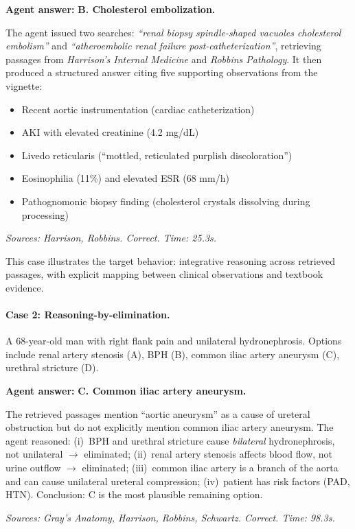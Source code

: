 \documentclass[10pt,twocolumn,letterpaper]{article}
\begin{document}
\begin{casebox}
\textbf{Agent answer:} \textbf{B. Cholesterol embolization.}

The agent issued two searches: \textit{``renal biopsy spindle-shaped vacuoles cholesterol embolism''} and \textit{``atheroembolic renal failure post-catheterization''}, retrieving passages from \textit{Harrison's Internal Medicine} and \textit{Robbins Pathology}. It then produced a structured answer citing five supporting observations from the vignette:
\begin{itemize}[nosep,leftmargin=*]
\item Recent aortic instrumentation (cardiac catheterization)
\item AKI with elevated creatinine (4.2 mg/dL)
\item Livedo reticularis (``mottled, reticulated purplish discoloration'')
\item Eosinophilia (11\%) and elevated ESR (68 mm/h)
\item Pathognomonic biopsy finding (cholesterol crystals dissolving during processing)
\end{itemize}
\textit{Sources: Harrison, Robbins. Correct. Time: 25.3s.}
\end{casebox}

This case illustrates the target behavior: integrative reasoning across retrieved passages, with explicit mapping between clinical observations and textbook evidence.

\paragraph{Case 2: Reasoning-by-elimination.}
A 68-year-old man with right flank pain and unilateral hydronephrosis. Options include renal artery stenosis (A), BPH (B), common iliac artery aneurysm (C), urethral stricture (D).

\begin{casebox}
\textbf{Agent answer:} \textbf{C. Common iliac artery aneurysm.}

The retrieved passages mention ``aortic aneurysm'' as a cause of ureteral obstruction but do not explicitly mention common iliac artery aneurysm. The agent reasoned: (i)~BPH and urethral stricture cause \emph{bilateral} hydronephrosis, not unilateral $\to$ eliminated; (ii)~renal artery stenosis affects blood flow, not urine outflow $\to$ eliminated; (iii)~common iliac artery is a branch of the aorta and can cause unilateral ureteral compression; (iv)~patient has risk factors (PAD, HTN). Conclusion: C is the most plausible remaining option.

\textit{Sources: Gray's Anatomy, Harrison, Robbins, Schwartz. Correct. Time: 98.3s.}
\end{casebox}
\end{document}
